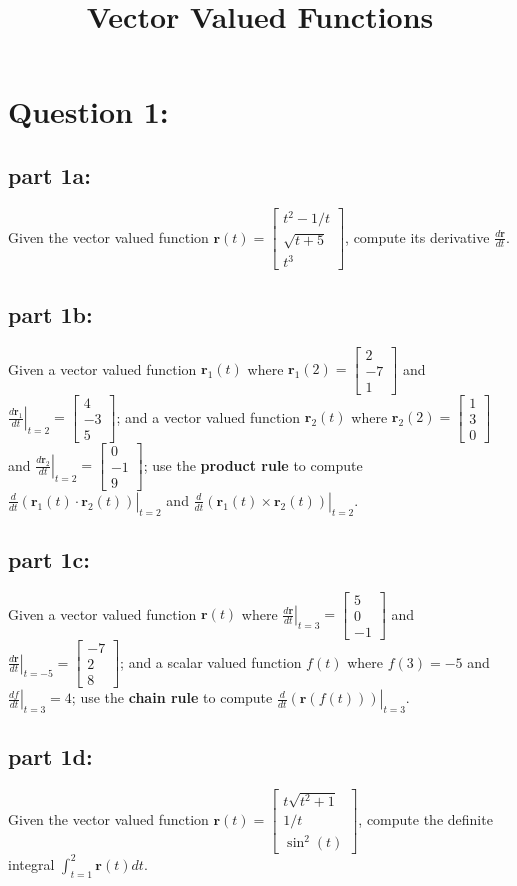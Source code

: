 \documentclass{article}
\title{Vector Valued Functions}
\date{}
\newcommand{\colvec}[3]{\begin{bmatrix} #1 \\ #2 \\ #3 \end{bmatrix}}
\newcommand{\at}[1]{\left. #1 \right|}
\begin{document}
\maketitle

\section*{Question 1:}


\subsection*{part 1a:}

Given the vector valued function \(\mathbf{r}(t) = \colvec{t^2 - 1/t}{\sqrt{t + 5}}{t^3}\), compute its derivative \(\frac{d\mathbf{r}}{dt}\).



\subsection*{part 1b:}

Given a vector valued function \(\mathbf{r}_1(t)\) where \(\mathbf{r}_1(2) = \colvec{2}{-7}{1}\) and \(\at{\frac{d\mathbf{r}_1}{dt}}_{t = 2} = \colvec{4}{-3}{5}\); and a vector valued function \(\mathbf{r}_2(t)\) where \(\mathbf{r}_2(2) = \colvec{1}{3}{0}\) and \(\at{\frac{d\mathbf{r}_2}{dt}}_{t = 2} = \colvec{0}{-1}{9}\); use the {\bf product rule} to compute \(\at{\frac{d}{dt}(\mathbf{r}_1(t) \cdot \mathbf{r}_2(t))}_{t = 2}\) and \(\at{\frac{d}{dt}(\mathbf{r}_1(t) \times \mathbf{r}_2(t))}_{t = 2}\). 



\subsection*{part 1c:}

Given a vector valued function \(\mathbf{r}(t)\) where \(\at{\frac{d\mathbf{r}}{dt}}_{t = 3} = \colvec{5}{0}{-1}\) and \(\at{\frac{d\mathbf{r}}{dt}}_{t = -5} = \colvec{-7}{2}{8}\); and a scalar valued function \(f(t)\) where \(f(3) = -5\) and \(\at{\frac{df}{dt}}_{t = 3} = 4\); use the {\bf chain rule} to compute \(\at{\frac{d}{dt}(\mathbf{r}(f(t)))}_{t = 3}\). 



\subsection*{part 1d:}

Given the vector valued function \(\mathbf{r}(t) = \colvec{t\sqrt{t^2 + 1}}{1/t}{\sin^2(t)}\), compute the definite integral \(\int_{t = 1}^2 \mathbf{r}(t)dt\). 
\end{document}
